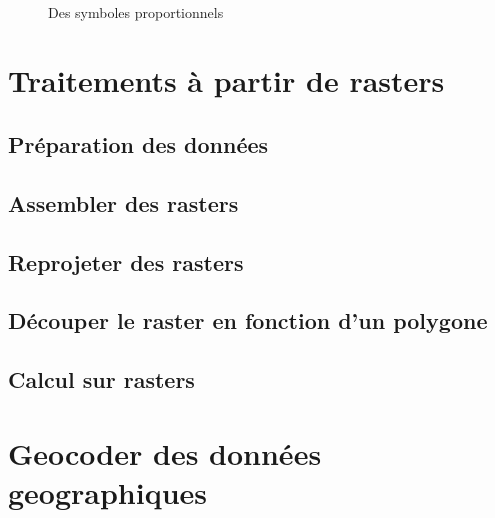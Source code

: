 \documentclass[a4paper, 11pt]{article}
\begin{document}
  \begin{figure}
  \centering
  \\
    \caption{Des symboles proportionnels}\label{fig:analyseThematique}
  \end{figure}

\section{Traitements à partir de rasters}
  \subsection{Préparation des données}
  \subsection{Assembler des rasters}
  \subsection{Reprojeter des rasters}
  \subsection{Découper le raster en fonction d'un polygone}
  \subsection{Calcul sur rasters}

\section{Geocoder des données geographiques}
\end{document}
